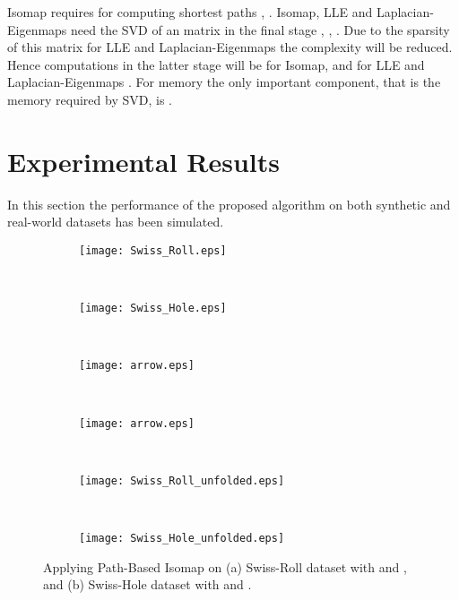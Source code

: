 \documentclass[10pt,journal,cspaper,compsoc]{IEEEtran}
\let\MYoriglatexcaption\caption
\renewcommand{\caption}[2][\relax]{\MYoriglatexcaption[#2]{#2}}
\begin{document}
Isomap requires  for computing shortest paths \cite{balasubramanian2002isomap}, \cite{pallottino1984shortest}. Isomap, LLE and Laplacian-Eigenmaps need the SVD of an  matrix in the final stage \cite{tenenbaum2000global}, \cite{roweis2000nonlinear}, \cite{belkin2003laplacian}. Due to the sparsity of this matrix for LLE and Laplacian-Eigenmaps the complexity will be reduced. Hence computations in the latter stage will be  for Isomap, and  for LLE and Laplacian-Eigenmaps \cite{berry1992large}. For memory the only important component, that is the memory required by SVD, is  \cite{berry1992large}.
\section{Experimental Results}
In this section the performance of the proposed algorithm on both synthetic and real-world datasets has been simulated.

\begin{figure}[t]
\centering
        \begin{subfigure}[b]{0.23\textwidth}
                \texttt{[image: Swiss\_Roll.eps]}
\end{subfigure}~
		\begin{subfigure}[b]{0.23\textwidth}
    		\texttt{[image: Swiss\_Hole.eps]}
\end{subfigure}\\
        \begin{subfigure}[b]{0.23\textwidth}
        \begin{center}
                \texttt{[image: arrow.eps]}
\end{center}
        \end{subfigure}~
        \begin{subfigure}[b]{0.23\textwidth}
        \begin{center}
                \texttt{[image: arrow.eps]}
\end{center}
	    \end{subfigure}\\
\begin{subfigure}[b]{0.23\textwidth}
                \texttt{[image: Swiss\_Roll\_unfolded.eps]}
                \caption{}
        \end{subfigure}~
        \begin{subfigure}[b]{0.23\textwidth}
                \texttt{[image: Swiss\_Hole\_unfolded.eps]}
                \caption{}
	    \end{subfigure}
        \vspace{2mm}
        \caption{{\small Applying Path-Based Isomap on (a) Swiss-Roll dataset with  and , and (b) Swiss-Hole dataset with  and .}}
        \label{fig_8_1}
\end{figure}
\end{document}
